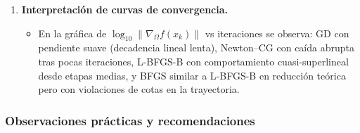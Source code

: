\documentclass[
  spanish,
  us-letterpaper,
  DIV=11,
  numbers=noendperiod]{scrreprt}
\providecommand{\tightlist}{%
  \setlength{\itemsep}{0pt}\setlength{\parskip}{0pt}}
\numberwithin{equation}{section}
\begin{document}
\begin{enumerate}
  \begin{itemize}
  \tightlist
  \item
    Dado que el Hessiano contiene términos \(\mu/(x_i-1)^2\) que crecen
    cuando \(x_i\to 1^+\), el problema es efectivamente mal condicionado
    cerca de la frontera. L-BFGS-B tolera bien esta condición gracias a
    la proyección y al escalado implícito. El método Newton--CG también
    es capaz de manejar esta situación, ya que no requiere formar
    explícitamente el Hessiano, sino únicamente productos del tipo
    \(\nabla^2 f(x) v\) \(\textit{hessiano-vector}\), los cuales pueden
    evaluarse eficientemente incluso en problemas de gran escala. Sin
    embargo, su desempeño depende críticamente de una implementación
    robusta del producto hessiano-vector y, en problemas altamente mal
    condicionados, de un precondicionador adecuado.
  \end{itemize}
\item
  \textbf{Interpretación de curvas de convergencia.}

  \begin{itemize}
  \tightlist
  \item
    En la gráfica de \(\log_{10}\|\nabla_\Omega f(x_k)\|\) vs
    iteraciones se observa: GD con pendiente suave (decadencia lineal
    lenta), Newton--CG con caída abrupta tras pocas iteraciones,
    L-BFGS-B con comportamiento cuasi-superlineal desde etapas medias, y
    BFGS similar a L-BFGS-B en reducción teórica pero con violaciones de
    cotas en la trayectoria.
  \end{itemize}
\end{enumerate}

\subsubsection{Observaciones prácticas y
recomendaciones}\label{observaciones-pruxe1cticas-y-recomendaciones}
\end{document}
